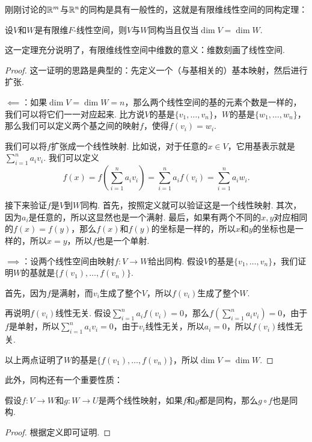 刚刚讨论的$\mathbb{R}^m$与$\mathbb{R}^n$的同构是具有一般性的，这就是有限维线性空间的同构定理：

\begin{theorem}[有限维线性空间的同构定理]\label{thm:finite-dim-linear-space-isomorphism}
设$V$和$W$是有限维$F$-线性空间，则$V$与$W$同构当且仅当$\dim V=\dim W$. 
\end{theorem}
这一定理充分说明了，有限维线性空间中维数的意义：维数刻画了线性空间. 
\begin{proof}
    这一证明的思路是典型的：先定义一个（与基相关的）基本映射，然后进行扩张. 
    
    $\impliedby$：如果$\dim V=\dim W=n$，那么两个线性空间的基的元素个数是一样的，我们可以将它们一一对应起来. 比方说$V$的基是$\{v_1,\dots,v_n\}$，$W$的基是$\{w_1,\dots,w_n\}$，那么我们可以定义两个基之间的映射$f$，使得$f(v_i)=w_i$. 
    
    我们可以将$f$扩张成一个线性映射. 比如说，对于任意的$x\in V$，它用基表示就是$\sum_{i=1}^n a_iv_i$. 我们可以定义
    \[f(x)=f\left(\sum_{i=1}^n a_iv_i\right)=\sum_{i=1}^n a_if(v_i)=\sum_{i=1}^n a_iw_i.\]

    接下来验证$f$是$V$到$W$同构. 首先，按照定义就可以验证这是一个线性映射. 其次，因为$a_i$是任意的，所以这显然也是一个满射. 最后，如果有两个不同的$x,y$对应相同的$f(x)=f(y)$，那么$f(x)$和$f(y)$的坐标是一样的，所以$x$和$y$的坐标也是一样的，所以$x=y$，所以$f$也是一个单射. 

    $\implies$：设两个线性空间由映射$f:V\to W$给出同构. 假设$V$的基是$\{v_1,\dots,v_n\}$，我们证明$W$的基就是$\{f(v_1),\dots,f(v_n)\}$. 
    
    首先，因为$f$是满射，而$v_i$生成了整个$V$，所以$f(v_i)$生成了整个$W$. 
    
    再说明$f(v_i)$线性无关. 假设$\sum_{i=1}^n a_if(v_i)=0$，那么$f(\sum_{i=1}^n a_iv_i)=0$，由于$f$是单射，所以$\sum_{i=1}^n a_iv_i=0$，由于$v_i$线性无关，所以$a_i=0$，所以$f(v_i)$线性无关. 
    
    以上两点证明了$W$的基是$\{f(v_1),\dots,f(v_n)\}$，所以$\dim V=\dim W$. 
\end{proof}

此外，同构还有一个重要性质：
\begin{proposition}\label{prop:isomorphism-composition}
假设$f:V\to W$和$g:W\to U$是两个线性映射，如果$f$和$g$都是同构，那么$g\circ f$也是同构. 
\end{proposition}
\begin{proof}
    根据定义即可证明.     
\end{proof}



